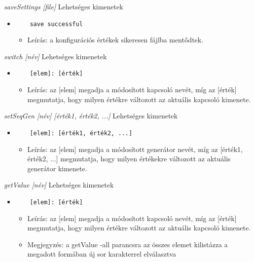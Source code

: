 \textit{saveSettings [file]}\newline
Lehetséges kimenetek
\begin{itemize}
	\item
	\begin{verbatim}
	save successful
	\end{verbatim}
	\begin{itemize}
		\item Leírás: a konfigurációs értékek sikeresen fájlba mentődtek.
	\end{itemize}
\end{itemize}

\textit{switch [név]}\newline
Lehetséges kimenetek
\begin{itemize}
	\item
	\begin{verbatim}
	[elem]: [érték]
	\end{verbatim}
	\begin{itemize}
		\item Leírás: az [elem] megadja a módosított kapcsoló nevét, míg az [érték] megmutatja, hogy milyen értékre változott az aktuális kapcsoló kimenete. 
	\end{itemize}
\end{itemize}

\textit{setSeqGen [név] [érték1, érték2, ...]}\newline
Lehetséges kimenetek
\begin{itemize}
	\item 
	\begin{verbatim}
	[elem]: [érték1, érték2, ...]
	\end{verbatim}
	\begin{itemize}
		\item Leírás: az [elem] megadja a módosított generátor nevét, míg az [érték1, érték2, ...] megmutatja, hogy milyen értékekre változott az aktuális generátor kimenete. 
	\end{itemize}
\end{itemize}

\textit{getValue [név]}\newline
Lehetséges kimenetek
\begin{itemize}
	\item
	\begin{verbatim}
	[elem]: [érték]
	\end{verbatim}
	\begin{itemize}
		\item Leírás: az [elem] megadja a módosított kapcsoló nevét, míg az [érték] megmutatja, hogy milyen értékre változott az aktuális kapcsoló kimenete.
		\item Megjegyzés: a getValue -all parancsra az összes elemet kilistázza a megadott formában új sor karakterrel elválasztva
	\end{itemize}
\end{itemize}

